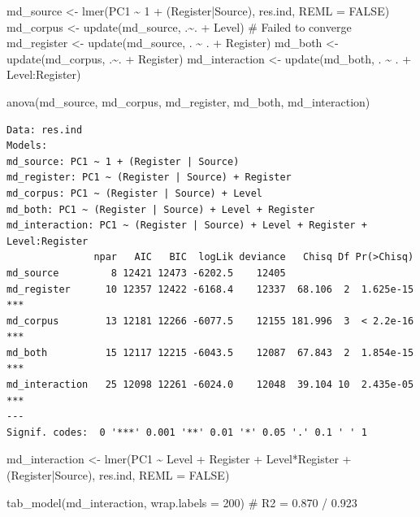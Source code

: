 \documentclass[
  letterpaper,
  DIV=11,
  numbers=noendperiod]{scrreprt}
\newenvironment{Shaded}{\begin{snugshade}}{\end{snugshade}}
\newcommand{\AttributeTok}[1]{\textcolor[rgb]{0.40,0.45,0.13}{#1}}
\newcommand{\CommentTok}[1]{\textcolor[rgb]{0.37,0.37,0.37}{#1}}
\newcommand{\ConstantTok}[1]{\textcolor[rgb]{0.56,0.35,0.01}{#1}}
\newcommand{\DecValTok}[1]{\textcolor[rgb]{0.68,0.00,0.00}{#1}}
\newcommand{\FunctionTok}[1]{\textcolor[rgb]{0.28,0.35,0.67}{#1}}
\newcommand{\NormalTok}[1]{\textcolor[rgb]{0.00,0.23,0.31}{#1}}
\newcommand{\OtherTok}[1]{\textcolor[rgb]{0.00,0.23,0.31}{#1}}
\newcommand{\SpecialCharTok}[1]{\textcolor[rgb]{0.37,0.37,0.37}{#1}}
\begin{document}
\begin{Shaded}
\begin{Highlighting}[]
\NormalTok{md\_source }\OtherTok{\textless{}{-}} \FunctionTok{lmer}\NormalTok{(PC1 }\SpecialCharTok{\textasciitilde{}} \DecValTok{1} \SpecialCharTok{+}\NormalTok{ (Register}\SpecialCharTok{|}\NormalTok{Source), res.ind, }\AttributeTok{REML =} \ConstantTok{FALSE}\NormalTok{) }
\NormalTok{md\_corpus }\OtherTok{\textless{}{-}} \FunctionTok{update}\NormalTok{(md\_source, .}\SpecialCharTok{\textasciitilde{}}\NormalTok{. }\SpecialCharTok{+}\NormalTok{ Level) }\CommentTok{\# Failed to converge}
\NormalTok{md\_register }\OtherTok{\textless{}{-}} \FunctionTok{update}\NormalTok{(md\_source, . }\SpecialCharTok{\textasciitilde{}}\NormalTok{ . }\SpecialCharTok{+}\NormalTok{ Register)}
\NormalTok{md\_both }\OtherTok{\textless{}{-}} \FunctionTok{update}\NormalTok{(md\_corpus, .}\SpecialCharTok{\textasciitilde{}}\NormalTok{. }\SpecialCharTok{+}\NormalTok{ Register)}
\NormalTok{md\_interaction }\OtherTok{\textless{}{-}} \FunctionTok{update}\NormalTok{(md\_both, . }\SpecialCharTok{\textasciitilde{}}\NormalTok{ . }\SpecialCharTok{+}\NormalTok{ Level}\SpecialCharTok{:}\NormalTok{Register)}

\FunctionTok{anova}\NormalTok{(md\_source, md\_corpus, md\_register, md\_both, md\_interaction)}
\end{Highlighting}
\end{Shaded}

\begin{verbatim}
Data: res.ind
Models:
md_source: PC1 ~ 1 + (Register | Source)
md_register: PC1 ~ (Register | Source) + Register
md_corpus: PC1 ~ (Register | Source) + Level
md_both: PC1 ~ (Register | Source) + Level + Register
md_interaction: PC1 ~ (Register | Source) + Level + Register + Level:Register
               npar   AIC   BIC  logLik deviance   Chisq Df Pr(>Chisq)    
md_source         8 12421 12473 -6202.5    12405                          
md_register      10 12357 12422 -6168.4    12337  68.106  2  1.625e-15 ***
md_corpus        13 12181 12266 -6077.5    12155 181.996  3  < 2.2e-16 ***
md_both          15 12117 12215 -6043.5    12087  67.843  2  1.854e-15 ***
md_interaction   25 12098 12261 -6024.0    12048  39.104 10  2.435e-05 ***
---
Signif. codes:  0 '***' 0.001 '**' 0.01 '*' 0.05 '.' 0.1 ' ' 1
\end{verbatim}

\begin{Shaded}
\begin{Highlighting}[]
\NormalTok{md\_interaction }\OtherTok{\textless{}{-}} \FunctionTok{lmer}\NormalTok{(PC1 }\SpecialCharTok{\textasciitilde{}}\NormalTok{ Level }\SpecialCharTok{+}\NormalTok{ Register }\SpecialCharTok{+}\NormalTok{ Level}\SpecialCharTok{*}\NormalTok{Register }\SpecialCharTok{+}\NormalTok{ (Register}\SpecialCharTok{|}\NormalTok{Source), res.ind, }\AttributeTok{REML =} \ConstantTok{FALSE}\NormalTok{) }

\FunctionTok{tab\_model}\NormalTok{(md\_interaction, }\AttributeTok{wrap.labels =} \DecValTok{200}\NormalTok{) }\CommentTok{\# R2 = 0.870 / 0.923}
\end{Highlighting}
\end{Shaded}
\end{document}
